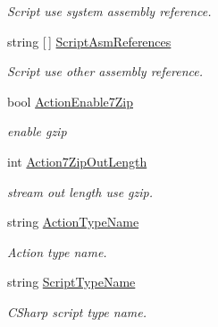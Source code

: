 \begin{DoxyCompactItemize}
\begin{DoxyCompactList}\small\item\em Script use system assembly reference. \end{DoxyCompactList}\item 
string \mbox{[}$\,$\mbox{]} \mbox{\hyperlink{class_t_net_1_1_runtime_1_1_zone_setting_a074524ae3fa7d629c6db594825f4d18c}{Script\+Asm\+References}}
\begin{DoxyCompactList}\small\item\em Script use other assembly reference. \end{DoxyCompactList}\item 
bool \mbox{\hyperlink{class_t_net_1_1_runtime_1_1_zone_setting_ac2f39b670a4c93031504822e13c1eba1}{Action\+Enable7\+Zip}}
\begin{DoxyCompactList}\small\item\em enable gzip \end{DoxyCompactList}\item 
int \mbox{\hyperlink{class_t_net_1_1_runtime_1_1_zone_setting_a416df9fea5ba1970a820c440a49e791c}{Action7\+Zip\+Out\+Length}}
\begin{DoxyCompactList}\small\item\em stream out length use gzip. \end{DoxyCompactList}\item 
string \mbox{\hyperlink{class_t_net_1_1_runtime_1_1_zone_setting_a8796474071a7933b7f66ca7b0edfbbae}{Action\+Type\+Name}}
\begin{DoxyCompactList}\small\item\em Action type name. \end{DoxyCompactList}\item 
string \mbox{\hyperlink{class_t_net_1_1_runtime_1_1_zone_setting_a13bb05e0f350e206ca4648201baae72a}{Script\+Type\+Name}}
\begin{DoxyCompactList}\small\item\em C\+Sharp script type name. \end{DoxyCompactList}\item 

\end{DoxyCompactItemize}
